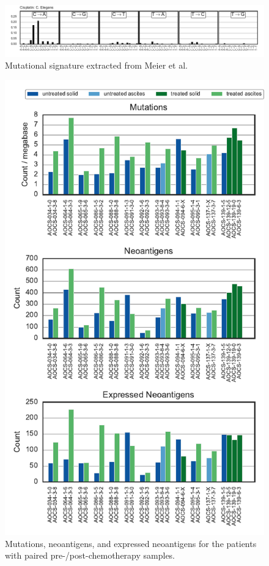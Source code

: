 \begin{figure}
\centering
\includegraphics[scale=1.0]{figures/extracted_signatures_worm.pdf}
\caption{Mutational signature extracted from Meier et al.~\cite{Meier_2014}}
\label{fig:supp_extracted_signatures_worm}
\end{figure}

\begin{figure}
\centering
\includegraphics[scale=1.0]{figures/paired_counts.pdf}
\caption{Mutations, neoantigens, and expressed neoantigens for the patients with paired pre-/post-chemotherapy samples.}
\label{fig:supp_paired}
\end{figure}

